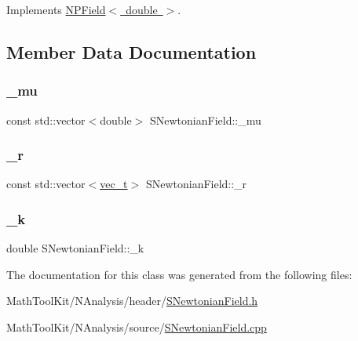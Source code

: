 Implements \mbox{\hyperlink{class_n_p_field_a6b92c4782bf41c0b81751821b93eb445}{N\+P\+Field$<$ double $>$}}.



\subsection{Member Data Documentation}
\mbox{\label{class_s_newtonian_field_a2f447c353aa350e8e06f1167077a6577}} 
\subsubsection{\texorpdfstring{\_mu}{\_mu}}
{\footnotesize\ttfamily const std\+::vector$<$double$>$ S\+Newtonian\+Field\+::\+\_\+mu\hspace{0.3cm}{\ttfamily [protected]}}

\mbox{\label{class_s_newtonian_field_ae905751c50bc53c9c9ad020d5d0b68b1}} 
\subsubsection{\texorpdfstring{\_r}{\_r}}
{\footnotesize\ttfamily const std\+::vector$<$\mbox{\hyperlink{group___n_algebra_ga0a2cfc67e738a3d73e4f12098c4c07f6}{vec\+\_\+t}}$>$ S\+Newtonian\+Field\+::\+\_\+r\hspace{0.3cm}{\ttfamily [protected]}}

\mbox{\label{class_s_newtonian_field_a6d87be6a91cbdd8b70890b00aac87127}} 
\subsubsection{\texorpdfstring{\_k}{\_k}}
{\footnotesize\ttfamily double S\+Newtonian\+Field\+::\+\_\+k\hspace{0.3cm}{\ttfamily [protected]}}



The documentation for this class was generated from the following files\+:\begin{DoxyCompactItemize}
\item 
Math\+Tool\+Kit/\+N\+Analysis/header/\mbox{\hyperlink{_s_newtonian_field_8h}{S\+Newtonian\+Field.\+h}}\item 
Math\+Tool\+Kit/\+N\+Analysis/source/\mbox{\hyperlink{_s_newtonian_field_8cpp}{S\+Newtonian\+Field.\+cpp}}\end{DoxyCompactItemize}

